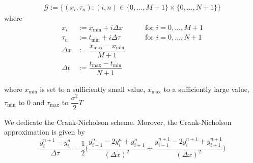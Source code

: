 \begin{align}
  \mathcal{G} := \{(x_i, \tau_n): (i, n) \in \{0, \dots, M+1\} \times \{0, \dots, N+1\}\}
\end{align}
where 
\begin{align}
  \label{eq:finitedifferencesschemes:overview:grid_2}
  x_i &:= x_{\text{min}} + i\Delta{x} &  \qquad \text{for $i = 0,\dots, M+1$} \\
  \tau_n &:= t_{\text{min}} + i{\Delta{\tau}} & \qquad \text{for $i = 0,\dots, N+1$} \\
  \Delta{x} &:= \dfrac{x_{\text{max}} - x_{\text{min}}}{M+1} \\ 
  \Delta{t} &:= \dfrac{t_{\text{max}} - t_{\text{min}}}{N+1}
\end{align}

where $x_{\text{min}}$ is set to a sufficiently small value, $x_{\text{max}}$ to a sufficiently large value, $\tau_{\text{min}}$ to 0 and $\tau_{\text{max}}$ to $\dfrac{\sigma^2}{2}T$

We dedicate the Crank-Nicholson scheme. Morover, the Crank-Nicholson approximation is given by 
\begin{equation}
  \dfrac{y^{n+1}_{i} - y^{n}_{i}}{\Delta \tau} = \dfrac{1}{2}\bigg(\dfrac{y^{n}_{i-1} - 2y^{n}_{i} + y^{n}_{i+1}}{(\Delta x)^2} + \dfrac{y^{n+1}_{i-1} - 2y^{n+1}_{i} + y^{n+1}_{i+1}}{(\Delta x)^2}\bigg)
\end{equation}

